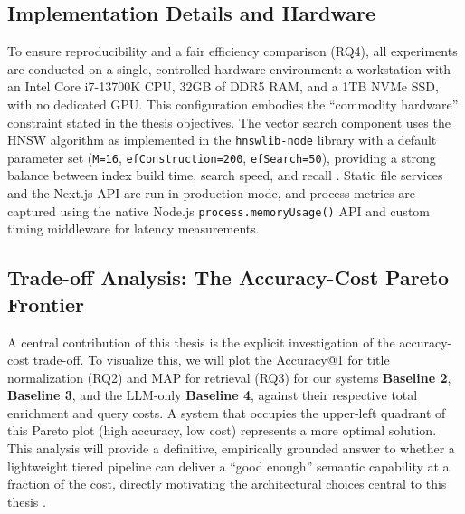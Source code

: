 \subsection{Implementation Details and Hardware}
To ensure reproducibility and a fair efficiency comparison (RQ4), all experiments are conducted on a single, controlled hardware environment: a workstation with an Intel Core i7-13700K CPU, 32GB of DDR5 RAM, and a 1TB NVMe SSD, with no dedicated GPU. This configuration embodies the ``commodity hardware'' constraint stated in the thesis objectives. The vector search component uses the HNSW algorithm as implemented in the \texttt{hnswlib-node} library with a default parameter set (\texttt{M=16}, \texttt{efConstruction=200}, \texttt{efSearch=50}), providing a strong balance between index build time, search speed, and recall \cite{malkov2018efficient}. Static file services and the Next.js API are run in production mode, and process metrics are captured using the native Node.js \texttt{process.memoryUsage()} API and custom timing middleware for latency measurements.

\subsection{Trade-off Analysis: The Accuracy-Cost Pareto Frontier}
A central contribution of this thesis is the explicit investigation of the accuracy-cost trade-off. To visualize this, we will plot the Accuracy@1 for title normalization (RQ2) and MAP for retrieval (RQ3) for our systems \textbf{Baseline 2}, \textbf{Baseline 3}, and the LLM-only \textbf{Baseline 4}, against their respective total enrichment and query costs. A system that occupies the upper-left quadrant of this Pareto plot (high accuracy, low cost) represents a more optimal solution. This analysis will provide a definitive, empirically grounded answer to whether a lightweight tiered pipeline can deliver a ``good enough'' semantic capability at a fraction of the cost, directly motivating the architectural choices central to this thesis \cite{hsieh2023distilling, menghani2023efficient}.